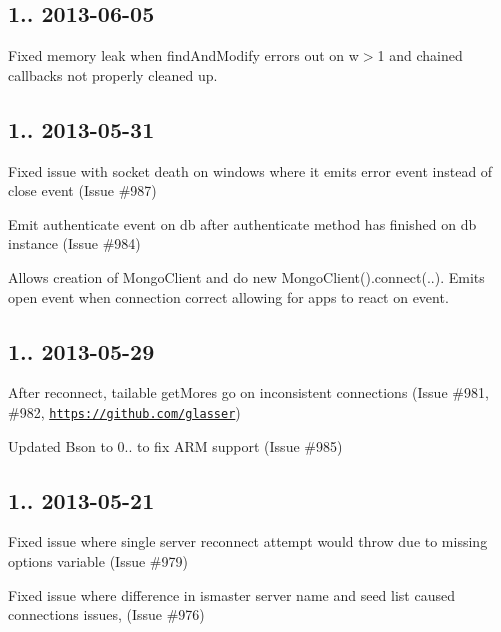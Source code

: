 \subsection*{1.. 2013-\/06-\/05 }


\begin{DoxyItemize}
\item Fixed memory leak when find\+And\+Modify errors out on w$>$1 and chained callbacks not properly cleaned up.
\end{DoxyItemize}

\subsection*{1.. 2013-\/05-\/31 }


\begin{DoxyItemize}
\item Fixed issue with socket death on windows where it emits error event instead of close event (Issue \#987)
\item Emit authenticate event on db after authenticate method has finished on db instance (Issue \#984)
\item Allows creation of Mongo\+Client and do new Mongo\+Client().connect(..). Emits open event when connection correct allowing for apps to react on event.
\end{DoxyItemize}

\subsection*{1.. 2013-\/05-\/29 }


\begin{DoxyItemize}
\item After reconnect, tailable get\+Mores go on inconsistent connections (Issue \#981, \#982, \href{https://github.com/glasser}{\tt https\+://github.\+com/glasser})
\item Updated Bson to 0.. to fix A\+RM support (Issue \#985)
\end{DoxyItemize}

\subsection*{1.. 2013-\/05-\/21 }


\begin{DoxyItemize}
\item Fixed issue where single server reconnect attempt would throw due to missing options variable (Issue \#979)
\item Fixed issue where difference in ismaster server name and seed list caused connections issues, (Issue \#976)
\end{DoxyItemize}

